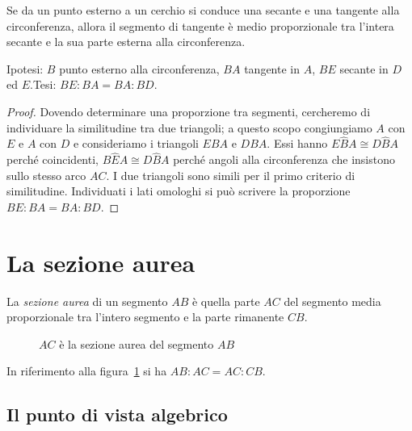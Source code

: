 \begin{teorema}
Se da un punto esterno a un cerchio si conduce una secante e una tangente alla circonferenza, allora il segmento di tangente è medio proporzionale tra l'intera secante e la sua parte esterna alla circonferenza.
\end{teorema}

\noindent Ipotesi: $B$ punto esterno alla circonferenza, $BA$ tangente in $A$, $BE$ secante in $D$ ed $E$.\tab Tesi: $BE:BA=BA:BD$.

\noindent\begin{minipage}{0.65\textwidth}\parindent15pt
\begin{proof}
Dovendo determinare una proporzione tra segmenti, cercheremo di individuare la similitudine tra due triangoli; a questo scopo congiungiamo $A$ con $E$ e $A$ con $D$ e consideriamo i triangoli $EBA$ e $DBA$. Essi hanno $E\widehat{B}A\cong D\widehat{B}A$ perché coincidenti, $B\widehat{E}A\cong D\widehat{B}A$ perché angoli alla circonferenza che insistono sullo stesso arco $AC$. I due triangoli sono simili per il primo criterio di similitudine. Individuati i lati omologhi si può scrivere la proporzione $BE:BA=BA:BD$.
\end{proof}
\end{minipage}\hfil
\begin{minipage}{0.35\textwidth}
	\centering
\end{minipage}\vspace{5pt}

\section{La sezione aurea}\label{sect:sezione_aurea}

\begin{definizione}
La \emph{sezione aurea} di un segmento $AB$ è quella parte $AC$ del segmento media proporzionale tra l'intero segmento e la parte rimanente $CB$.
\end{definizione}

\begin{figure}[!htb]
	\centering
	\caption{$AC$ è la sezione aurea del segmento $AB$}\label{fig:sez_aurea}
\end{figure}

In riferimento alla figura~\ref{fig:sez_aurea} si ha $AB : AC = AC : CB$.

\subsection{Il punto di vista algebrico}

